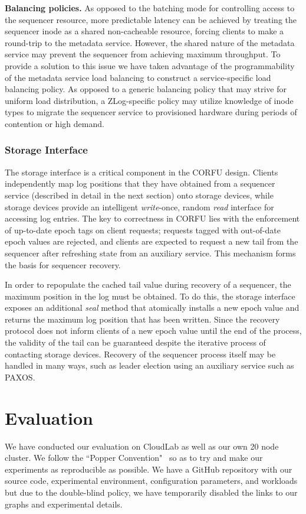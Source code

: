 \documentclass[10pt,twocolumn]{article}
\begin{document}
{\bf Balancing policies.}
As opposed to the batching mode for controlling access to the sequencer
resource, more predictable latency can be achieved by treating the sequencer
inode as a shared non-cacheable resource, forcing clients to make a round-trip
to the metadata service. However, the shared nature of the metadata service
may prevent the sequencer from achieving maximum throughput. To provide a
solution to this issue we have taken advantage of the programmability of the
metadata service load balancing to construct a service-specific load balancing
policy. As opposed to a generic balancing policy that may strive for uniform
load distribution, a ZLog-specific policy may utilize knowledge of inode types
to migrate the sequencer service to provisioned hardware during periods of
contention or high demand.

\subsubsection{Storage Interface}

The storage interface is a critical component in the CORFU design. Clients
independently map log positions that they have obtained from a sequencer
service (described in detail in the next section) onto storage devices, while
storage devices provide an intelligent \emph{write}-once, random \emph{read}
interface for accessing log entries. The key to correctness in CORFU lies with
the enforcement of up-to-date epoch tags on client requests; requests tagged
with out-of-date epoch values are rejected, and clients are expected to
request a new tail from the sequencer after refreshing state from an auxiliary
service.  This mechanism forms the basis for sequencer recovery.

In order to repopulate the cached tail value during recovery of a sequencer,
the maximum position in the log must be obtained. To do this, the storage
interface exposes an additional \emph{seal} method that atomically installs a
new epoch value and returns the maximum log position that has been written.
Since the recovery protocol does not inform clients of a new epoch value until
the end of the process, the validity of the tail can be guaranteed despite the
iterative process of contacting storage devices.  Recovery of the sequencer
process itself may be handled in many ways, such as leader election using an
auxiliary service such as PAXOS.

\section{Evaluation} \label{evaluation} We have conducted our evaluation on
CloudLab as well as our own 20 node cluster. We follow the ``Popper
Convention"~\cite{anonymous} so as to try and make our experiments as
reproducible as possible. We have a GitHub repository with our source code,
experimental environment, configuration parameters, and workloads but due to
the double-blind policy, we have temporarily disabled the links to our graphs
and experimental details.
\end{document}
